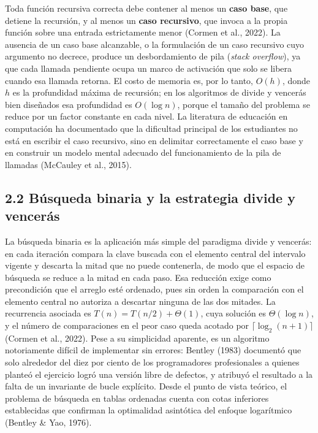 \documentclass[12pt,a4paper]{article}
\begin{document}
Toda función recursiva correcta debe contener al menos un \textbf{caso base}, que
detiene la recursión, y al menos un \textbf{caso recursivo}, que invoca a la propia
función sobre una entrada estrictamente menor (Cormen et al., 2022). La ausencia de
un caso base alcanzable, o la formulación de un caso recursivo cuyo argumento no
decrece, produce un desbordamiento de pila (\textit{stack overflow}), ya que cada
llamada pendiente ocupa un marco de activación que solo se libera cuando esa llamada
retorna. El costo de memoria es, por lo tanto, $O(h)$, donde $h$ es la profundidad
máxima de recursión; en los algoritmos de divide y vencerás bien diseñados esa
profundidad es $O(\log n)$, porque el tamaño del problema se reduce por un factor
constante en cada nivel. La literatura de educación en computación ha documentado
que la dificultad principal de los estudiantes no está en escribir el caso recursivo,
sino en delimitar correctamente el caso base y en construir un modelo mental adecuado
del funcionamiento de la pila de llamadas (McCauley et al., 2015).

\subsection*{2.2 Búsqueda binaria y la estrategia divide y vencerás}

La búsqueda binaria es la aplicación más simple del paradigma divide y vencerás: en
cada iteración compara la clave buscada con el elemento central del intervalo vigente
y descarta la mitad que no puede contenerla, de modo que el espacio de búsqueda se
reduce a la mitad en cada paso. Esa reducción exige como precondición que el arreglo
esté ordenado, pues sin orden la comparación con el elemento central no autoriza a
descartar ninguna de las dos mitades. La recurrencia asociada es
$T(n) = T(n/2) + \Theta(1)$, cuya solución es $\Theta(\log n)$, y el número de
comparaciones en el peor caso queda acotado por $\lceil \log_2(n+1) \rceil$
(Cormen et al., 2022). Pese a su simplicidad aparente, es un algoritmo notoriamente
difícil de implementar sin errores: Bentley (1983) documentó que solo alrededor del
diez por ciento de los programadores profesionales a quienes planteó el ejercicio
logró una versión libre de defectos, y atribuyó el resultado a la falta de un
invariante de bucle explícito. Desde el punto de vista teórico, el problema de
búsqueda en tablas ordenadas cuenta con cotas inferiores establecidas que confirman
la optimalidad asintótica del enfoque logarítmico (Bentley \& Yao, 1976).
\end{document}
